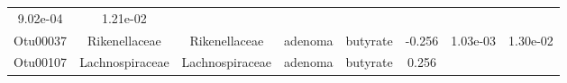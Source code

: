 \documentclass[11pt,]{article}
\begin{document}
\begin{longtable}[]{@{}cccccccc@{}}
\begin{minipage}[t]{0.08\columnwidth}
9.02e-04\strut
\end{minipage} & \begin{minipage}[t]{0.08\columnwidth}\centering\strut
1.21e-02\strut
\end{minipage}\tabularnewline
\begin{minipage}[t]{0.08\columnwidth}\centering\strut
Otu00037\strut
\end{minipage} & \begin{minipage}[t]{0.15\columnwidth}\centering\strut
Rikenellaceae\strut
\end{minipage} & \begin{minipage}[t]{0.15\columnwidth}\centering\strut
Rikenellaceae\strut
\end{minipage} & \begin{minipage}[t]{0.08\columnwidth}\centering\strut
adenoma\strut
\end{minipage} & \begin{minipage}[t]{0.09\columnwidth}\centering\strut
butyrate\strut
\end{minipage} & \begin{minipage}[t]{0.07\columnwidth}\centering\strut
-0.256\strut
\end{minipage} & \begin{minipage}[t]{0.08\columnwidth}\centering\strut
1.03e-03\strut
\end{minipage} & \begin{minipage}[t]{0.08\columnwidth}\centering\strut
1.30e-02\strut
\end{minipage}\tabularnewline
\begin{minipage}[t]{0.08\columnwidth}\centering\strut
Otu00107\strut
\end{minipage} & \begin{minipage}[t]{0.15\columnwidth}\centering\strut
Lachnospiraceae\strut
\end{minipage} & \begin{minipage}[t]{0.15\columnwidth}\centering\strut
Lachnospiraceae\strut
\end{minipage} & \begin{minipage}[t]{0.08\columnwidth}\centering\strut
adenoma\strut
\end{minipage} & \begin{minipage}[t]{0.09\columnwidth}\centering\strut
butyrate\strut
\end{minipage} & \begin{minipage}[t]{0.07\columnwidth}\centering\strut
0.256\strut
\end{minipage} & \begin{minipage}[t]{0.08\columnwidth}\centering\strut

\end{minipage}
\end{longtable}
\end{document}
